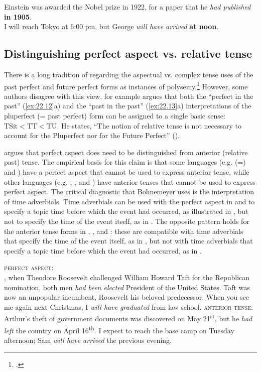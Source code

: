 \ea \label{ex:22.13}
\ea Einstein was awarded the Nobel prize in 1922, for a paper that he \textit{had published} \textbf{in 1905}.\\
\ex I will reach Tokyo at 6:00 pm, but George \textit{will have arrived} \textbf{at noon}.
                       \z
\z

\subsection{Distinguishing perfect aspect vs. relative tense}\label{sec:22.3.2}

There is a long tradition of regarding the aspectual vs. complex tense uses of the past perfect and future perfect forms as instances of polysemy.\footnote{\citet{Jespersen1924,Comrie1976}.} However, some authors disagree with this view. \citet{Klein1994} for example argues that both the “perfect in the past” (\ref{ex:22.12}a) and the “past in the past” (\ref{ex:22.13}a) interpretations of the pluperfect (= past perfect) form can be assigned to a single basic sense: $\text{TSit} < \text{TT} < \text{TU}$. He states, “The notion of relative tense is not necessary to account for the Pluperfect nor for the Future Perfect” (\citeyear[131]{Klein1994}).

\citet{Bohnemeyer2014} argues that perfect aspect does need to be distinguished from anterior (relative past) tense. The empirical basis for this claim is that some languages (e.g.  (=) and ) have a perfect aspect that cannot be used to express anterior tense, while other languages (e.g. , , and ) have anterior tenses that cannot be used to express perfect aspect. The critical diagnostic that Bohnemeyer uses is the interpretation of time adverbials. Time adverbials can be used with the perfect aspect in  and  to specify a topic time before which the event had occurred, as illustrated in , but not to specify the time of the event itself, as in . The opposite pattern holds for the anterior tense forms in , , and : these are compatible with time adverbials that specify the time of the event itself, as in , but not with time adverbials that specify a topic time before which the event had occurred, as in .


\ea \label{ex:22.14}
\textsc{perfect aspect:}\\
, when Theodore Roosevelt challenged William Howard Taft for the Republican nomination, both men \textit{had been elected} President of the United States. Taft was now an unpopular incumbent, Roosevelt his beloved predecessor.
\ex  When you see me again next Christmas, I \textit{will have graduated} from law school.
\z
\ex \label{ex:22.15}
\textsc{anterior tense:}\\
\ea  Arthur’s theft of government documents was discovered on May 21\textsuperscript{st}, but he \textit{had left} the country on April 16\textsuperscript{th}.
\ex  I expect to reach the base camp on Tuesday afternoon; Sam \textit{will have arrived} the previous evening.
\z \z



